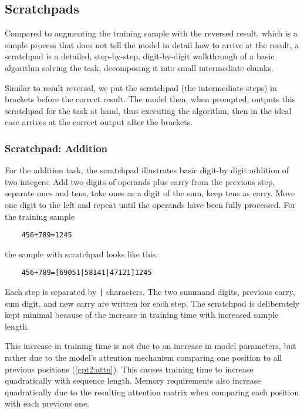 \subsection{Scratchpads}
\label{arith:scratchpad}


Compared to augmenting the training sample with the reversed result, which is a simple process that does not tell the model in detail how to arrive at the result, a scratchpad is a detailed, step-by-step, digit-by-digit walkthrough of a basic algorithm solving the task, decomposing it into small intermediate chunks.

Similar to result reversal, we put the scratchpad (the intermediate steps) in brackets before the correct result. The model then, when prompted, outputs this scratchpad for the task at hand, thus executing the algorithm, then in the ideal case arrives at the correct output after the brackets.

\subsubsection{Scratchpad: Addition}
\label{add_scratchpad}

For the addition task, the scratchpad illustrates basic digit-by digit addition of two integers: Add two digits of operands plus carry from the previous step, separate ones and tens, take ones as a digit of the sum, keep tens as carry. Move one digit to the left and repeat until the operands have been fully processed. For the training sample

\begin{lstlisting}
	456+789=1245
\end{lstlisting}

\noindent
the sample with scratchpad looks like this:

\begin{lstlisting}
	456+789=[69051|58141|47121]1245
\end{lstlisting}

\noindent
Each step is separated by \verb!|! characters. The two summand digits, previous carry, sum digit, and new carry are written for each step.
The scratchpad is deliberately kept minimal because of the increase in training time with increased sample length.

\label{training_time_growth}
This increase in training time is not due to an increase in model parameters, but rather due to the model's attention mechanism comparing one position to all previous positions (\cref{gpt2:attn}). This causes training time to increase quadratically with sequence length. Memory requirements also increase quadratically due to the resulting attention matrix when comparing each position with each previous one.

